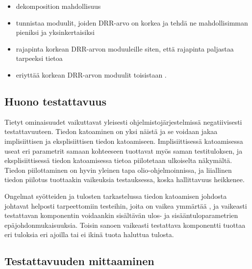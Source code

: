 \documentclass[finnish]{tktltiki2}
\theoremstyle{definition}
\theoremstyle{remark}
\begin{document}
\begin{itemize}
	\item dekomposition mahdollisuus
	\item tunnistaa moduulit, joiden DRR-arvo on korkea ja tehdä ne mahdollisimman pieniksi ja yksinkertaisiksi
	\item rajapinta korkean DRR-arvon moduuleille siten, että rajapinta paljastaa tarpeeksi tietoa
	\item eriyttää korkean DRR-arvon moduulit toisistaan \citep[s. 23]{Voas:1995:STN:624607.625469}.
\end{itemize}






\subsection{Huono testattavuus}

Tietyt ominaisuudet vaikuttavat yleisesti ohjelmistojärjestelmissä negatiivisesti testattavuuteen. Tiedon katoaminen on yksi näistä \citep[s. 20-22]{Voas:1995:STN:624607.625469} ja se voidaan jakaa implisiittisen ja eksplisiittisen tiedon katoamiseen. Implisiittisessä katoamisessa useat eri parametrit samaan kohteeseen tuottavat myös saman testituloksen, ja eksplisiittisessä tiedon katoamisessa tietoa piilotetaan ulkoiselta näkymältä. Tiedon piilottaminen on hyvin yleinen tapa olio-ohjelmoinnissa, ja liiallinen tiedon piilotus tuottaakin vaikeuksia testauksessa, koska hallittavuus heikkenee. 

Ongelmat syötteiden ja tulosten tarkastelussa tiedon katoamisen johdosta johtavat helposti tarpeettomiin testeihin, joita on vaikea ymmärtää \citep[s. 554]{Freedman:1991:TSC:126218.126229}, ja vaikeasti testattavan komponentin voidaankin sisältävän ulos- ja sisääntuloparametrien epäjohdonmukaisuuksia. Toisin sanoen vaikeasti testattava komponentti tuottaa eri tuloksia eri ajoilla tai ei ikinä tuota haluttua tulosta.   




\subsection{Testattavuuden mittaaminen}

\end{document}
